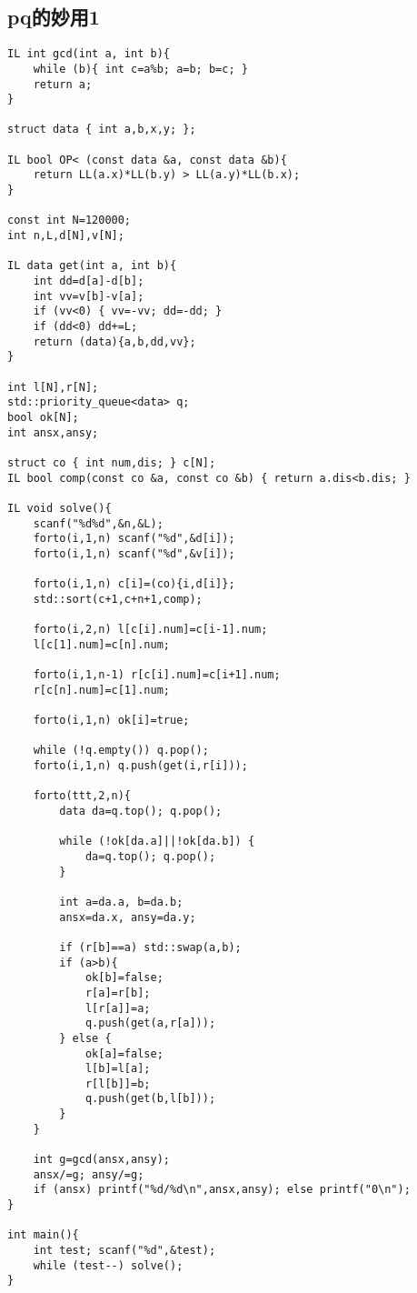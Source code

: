 \documentclass{article}
\begin{document}
\subsection{pq的妙用1}
\begin{lstlisting}
IL int gcd(int a, int b){
	while (b){ int c=a%b; a=b; b=c; }
	return a;
}

struct data { int a,b,x,y; };

IL bool OP< (const data &a, const data &b){
	return LL(a.x)*LL(b.y) > LL(a.y)*LL(b.x);
}

const int N=120000;
int n,L,d[N],v[N];

IL data get(int a, int b){
	int dd=d[a]-d[b];
	int vv=v[b]-v[a];
	if (vv<0) { vv=-vv; dd=-dd; }
	if (dd<0) dd+=L;
	return (data){a,b,dd,vv};
}

int l[N],r[N];
std::priority_queue<data> q;
bool ok[N];
int ansx,ansy;

struct co { int num,dis; } c[N];
IL bool comp(const co &a, const co &b) { return a.dis<b.dis; }

IL void solve(){
	scanf("%d%d",&n,&L);
	forto(i,1,n) scanf("%d",&d[i]);
	forto(i,1,n) scanf("%d",&v[i]);
	
	forto(i,1,n) c[i]=(co){i,d[i]};
	std::sort(c+1,c+n+1,comp);
	
	forto(i,2,n) l[c[i].num]=c[i-1].num;
	l[c[1].num]=c[n].num;
	
	forto(i,1,n-1) r[c[i].num]=c[i+1].num;
	r[c[n].num]=c[1].num;
	
	forto(i,1,n) ok[i]=true;
	
	while (!q.empty()) q.pop();
	forto(i,1,n) q.push(get(i,r[i]));
	
	forto(ttt,2,n){
		data da=q.top(); q.pop();
		
		while (!ok[da.a]||!ok[da.b]) {
			da=q.top(); q.pop();
		}
		
		int a=da.a, b=da.b;
		ansx=da.x, ansy=da.y;
		
		if (r[b]==a) std::swap(a,b);
		if (a>b){
			ok[b]=false;
			r[a]=r[b];
			l[r[a]]=a;
			q.push(get(a,r[a]));
		} else {
			ok[a]=false;
			l[b]=l[a];
			r[l[b]]=b;
			q.push(get(b,l[b]));
		}
	}
	
	int g=gcd(ansx,ansy);
	ansx/=g; ansy/=g;
	if (ansx) printf("%d/%d\n",ansx,ansy); else printf("0\n");
}

int main(){
	int test; scanf("%d",&test);
	while (test--) solve();
}
\end{lstlisting}
\end{document}
